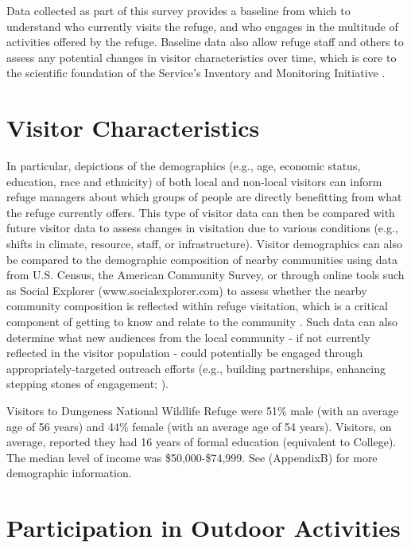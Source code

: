 \documentclass[]{book}
\let\BeginKnitrBlock\begin \let\EndKnitrBlock\end
\begin{document}
Data collected as part of this survey provides a baseline from which to
understand who currently visits the refuge, and who engages in the
multitude of activities offered by the refuge. Baseline data also allow
refuge staff and others to assess any potential changes in visitor
characteristics over time, which is core to the scientific foundation of
the Service's Inventory and Monitoring Initiative \citep{USFWS2017}.

\section*{Visitor Characteristics}\label{visitor-characteristics}

\BeginKnitrBlock{heading4}
In particular, depictions of the demographics (e.g., age, economic
status, education, race and ethnicity) of both local and non-local
visitors can inform refuge managers about which groups of people are
directly benefitting from what the refuge currently offers. This type of
visitor data can then be compared with future visitor data to assess
changes in visitation due to various conditions (e.g., shifts in
climate, resource, staff, or infrastructure). Visitor demographics can
also be compared to the demographic composition of nearby communities
using data from U.S. Census, the American Community Survey, or through
online tools such as Social Explorer (www.socialexplorer.com) to assess
whether the nearby community composition is reflected within refuge
visitation, which is a critical component of getting to know and relate
to the community \citep{USFWS2014}. Such data can also determine what
new audiences from the local community - if not currently reflected in
the visitor population - could potentially be engaged through
appropriately-targeted outreach efforts (e.g., building partnerships,
enhancing stepping stones of engagement; \citep{USFWS2014}).
\EndKnitrBlock{heading4}

Visitors to Dungeness National Wildlife Refuge were 51\% male (with an
average age of 56 years) and 44\% female (with an average age of 54
years). Visitors, on average, reported they had 16 years of formal
education (equivalent to College). The median level of income was
\$50,000-\$74,999. See (AppendixB) for more demographic information.

\section*{Participation in Outdoor
Activities}\label{participation-in-outdoor-activities}
\end{document}
